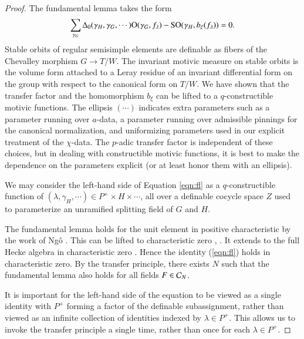 \begin{proof}
The fundamental lemma takes the form
\begin{equation}\label{eqn:fl}
\sum_{\gamma_G}\Delta_0(\gamma_H,\gamma_G,\cdots){\operatorname{O}}(\gamma_G,f_\lambda) - {\operatorname{SO}}(\gamma_H,b_\xi(f_\lambda)) = 0.
\end{equation}
Stable orbits of regular semisimple elements are definable as fibers of the Chevalley morphism $G\to T/W$.  The invariant motivic measure
on stable orbits is the volume form attached to a Leray residue of an invariant differential form on the group with respect to the canonical
form on $T/W$.  We have shown that the transfer factor and the homomorphism $b_\xi$ can be lifted to a $q$-constructible motivic functions.
The ellipsis $(\cdots)$ indicates extra parameters such as a parameter running over $a$-data, a parameter running over admissible pinnings
for the canonical normalization, and uniformizing parameters used in our explicit treatment of the $\chi$-data.  The $p$-adic transfer factor is independent of these choices,
but in dealing with constructible motivic functions, it is best to make the dependence on the parameters explicit (or at least honor them with an ellipsis).

We may consider the left-hand side of Equation \ref{eqn:fl} as a $q$-constructible function of $(\lambda,\gamma_H,\cdots)\in P^+\times H\times\cdots$, all over a definable
cocycle space $Z$ used to parameterize an unramified splitting field of $G$ and $H$.  

The fundamental lemma holds for the unit element in positive characteristic by the work of Ng\^o \cite{ngo2010lemme}.
This can be lifted to characteristic zero \cite{cluckers2011transfer}, \cite{waldspurger2006endoscopie}.  
It extends to the full Hecke algebra in characteristic zero \cite{hales1995fundamental}.
Hence the identity (\ref{eqn:fl}) holds in characteristic zero.
By the transfer principle, 
there exists $N$ such that the fundamental lemma also holds for all fields $F\in\mathcal C_N$.

It is important for the left-hand side of the equation to be viewed as a 
single identity with $P^+$ forming a factor of the definable subassignment, rather than viewed as an infinite collection of identities indexed by $\lambda\in P^+$.
This allows us to invoke the transfer principle a single time, rather than once for each $\lambda\in P^+$.
\end{proof}




